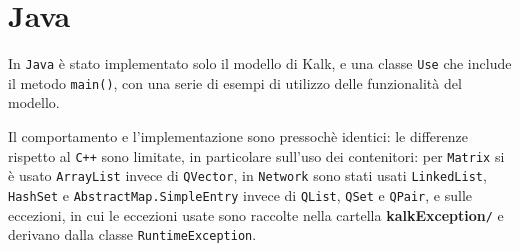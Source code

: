 \section{Java}

In \texttt{Java} è stato implementato solo il modello di Kalk, e una classe \texttt{Use} che include il metodo \texttt{main()}, con una 
serie di esempi di utilizzo delle funzionalità del modello.\par
Il comportamento e l'implementazione sono pressochè identici: le differenze rispetto al \texttt{C++} sono limitate, in particolare 
sull'uso dei contenitori: per \texttt{Matrix} si è usato \texttt{ArrayList} invece di \texttt{QVector}, in \texttt{Network} sono stati 
usati \texttt{LinkedList}, \texttt{HashSet} e \texttt{AbstractMap.SimpleEntry} invece di \texttt{QList}, \texttt{QSet} e \texttt{QPair}, e sulle eccezioni, 
in cui le eccezioni usate sono raccolte nella cartella \textbf{kalkException}\verb|/| e derivano dalla classe \texttt{RuntimeException}.